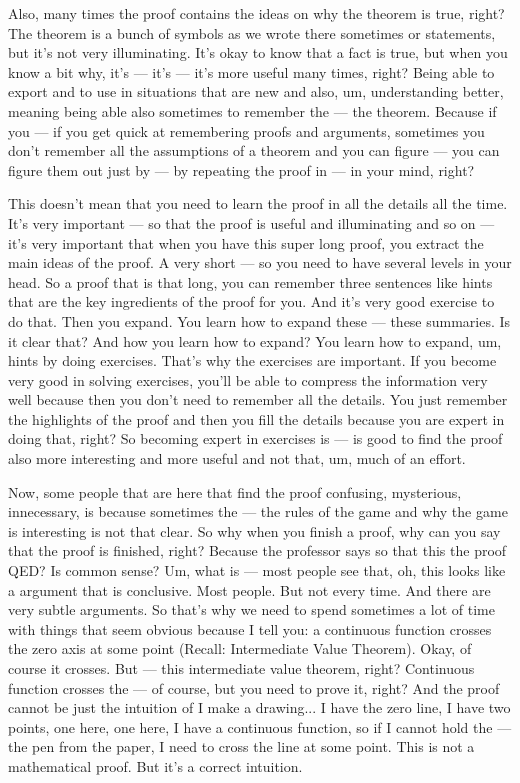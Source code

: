 \begin{spoken-clean}[00:28:30 - 00:31:17]
Also, many times the proof contains the ideas on why the theorem is true, right? The theorem is a bunch of symbols as we wrote there sometimes or statements, but it's not very illuminating. It's okay to know that a fact is true, but when you know a bit why, it's — it's — it's more useful many times, right? Being able to export and to use in situations that are new and also, um, understanding better, meaning being able also sometimes to remember the — the theorem. Because if you — if you get quick at remembering proofs and arguments, sometimes you don't remember all the assumptions of a theorem and you can figure — you can figure them out just by — by repeating the proof in — in your mind, right?

This doesn't mean that you need to learn the proof in all the details all the time. It's very important — so that the proof is useful and illuminating and so on — it's very important that when you have this super long proof, you extract the main ideas of the proof. A very short — so you need to have several levels in your head. So a proof that is that long, you can remember three sentences like hints that are the key ingredients of the proof for you. And it's very good exercise to do that. Then you expand. You learn how to expand these — these summaries. Is it clear that? And how you learn how to expand? You learn how to expand, um, hints by doing exercises. That's why the exercises are important. If you become very good in solving exercises, you'll be able to compress the information very well because then you don't need to remember all the details. You just remember the highlights of the proof and then you fill the details because you are expert in doing that, right? So becoming expert in exercises is — is good to find the proof also more interesting and more useful and not that, um, much of an effort.

Now, some people that are here that find the proof confusing, mysterious, innecessary, is because sometimes the — the rules of the game and why the game is interesting is not that clear. So why when you finish a proof, why can you say that the proof is finished, right? Because the professor says so that this the proof QED? Is common sense? Um, what is — most people see that, oh, this looks like a argument that is conclusive. Most people. But not every time. And there are very subtle arguments. So that's why we need to spend sometimes a lot of time with things that seem obvious because I tell you: a continuous function crosses the zero axis at some point (Recall: Intermediate Value Theorem). Okay, of course it crosses. But — this intermediate value theorem, right? Continuous function crosses the — of course, but you need to prove it, right? And the proof cannot be just the intuition of I make a drawing...  I have the zero line, I have two points, one here, one here, I have a continuous function, so if I cannot hold the — the pen from the paper, I need to cross the line at some point. This is not a mathematical proof. But it's a correct intuition.
\end{spoken-clean}

